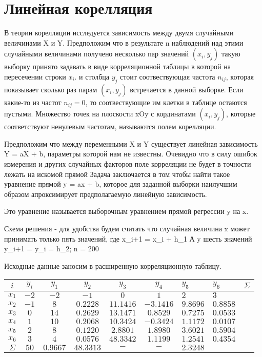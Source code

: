 \documentclass[a4paper]{article}
\begin{document}
\section{Линейная корелляция}
В теории корелляции исследуется зависимость между двумя случайными величинами X и Y. Предположим что в результате n наблюдений над этими случайными величинами получено несколько пар значений $(x_i, y_j)$
такую выборку принято задавать в виде корреляционной таблицы в которой на пересечении строки $x_i$. и столбца $y_j$ стоит соотвествующая частота $n_{ij}$, которая показывает сколько раз парам $(x_i, y_j)$ встречается в данной выборке. Если какие-то из частот $n_{ij} = 0$, то соотвествующие им клетки в таблице остаются пустыми. Множество точек на плоскости xOy с кординатами $(x_i, y_j)$, которые соответствуют ненулевым частотам, называются полем корелляции.

Предположим что между переменными X и Y существует линейная зависимость Y = aX + b, параметры которой нам не известны.
Очевидно что в силу ошибок измерения и других случайных факторов поле корреляции не будет в точности лежать на искомой прямой 
Задача заключается в том чтобы найти такое уравнение прямой y = ax + b, которое для заданной выборки наилучшим образом апроксимирует 
предполагаемую линейную зависимость. 

Это уравнение называется выборочным уравнением прямой регрессии y на x.

Схема решения - для удобства будем считать что случайная величина x может принимать только пять значений, где x_{i+1} = x_i + h_1
А y шесть значений y_{i+1} = y_i = h_2;
n = 200

Исходные данные заносим в расширенную корреляционную таблицу.
\begin{table}[H]
    \centering
    \begin{tabular}{|c|c|c|c|c|c|}
        \hline
        $i$  & $y_i$ & $y_1$ & $y_2$ & $y_3$ & $y_4$ & $y_5$ & $y_6$ & $\Sigma$ \\
        \hline
        $x_1$ & $ -2 $ & $ -2 $  & $-1$ & $0$  & $1$ & $2$ & $3$  \\
        $x_2$ & $ -1 $ & $ 8 $  & $0.2228$ & $11.1416$ & $-3.1416$ & $ 9.8696 $ & $0.8858$  \\
        $x_3$ & $  0 $ & $ 14 $ & $0.2629$ & $13.1471$ & $0.8529$ & $ 0.7275 $ & $0.0533$  \\
        $x_4$ & $  1 $ & $ 10 $ & $0.2068$ & $10.3424$ & $-0.3424$ & $ 1.1172 $ & $0.0107$  \\
        $x_5$ & $  2 $ & $ 8 $  & $0.1220$ & $2.8801$  & $1.8980$ & $ 3.6021$ & $0.5904$  \\
        $x_6$ & $  3 $ & $ 4 $  & $0.0576$ & $48.3342$ & $1.1199$ & $ 1.2541 $ & $0.4354$  \\
        $\Sigma$ & $50$ & $0.9667$ & $48.3313$ & $-$ & $-$ & $2.3248$ \\  
        \hline
    \end{tabular}
\end{table}
\end{document}
